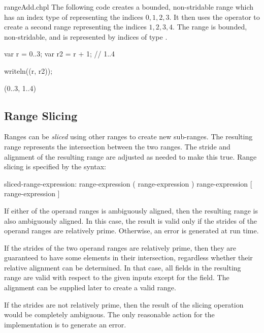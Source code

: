 \begin{chapelexample}{rangeAdd.chpl}
The following code creates a bounded, non-stridable range 
which has an index type of  representing the indices ${0, 1, 2, 3}$.  
It then uses the \chpl{+} operator to create a second range 
representing the indices ${1, 2, 3, 4}$.  The  range is bounded,
non-stridable, and is represented by indices of type .
\begin{chapel}
var r = 0..3;
var r2 = r + 1;    // 1..4
\end{chapel}
\begin{chapelpost}
writeln((r, r2));
\end{chapelpost}
\begin{chapeloutput}
(0..3, 1..4)
\end{chapeloutput}
\end{chapelexample}


\subsection{Range Slicing}
\label{Range_Slicing}

Ranges can be \emph{sliced} using other ranges to create new
sub-ranges.  The resulting range represents the intersection between
the two ranges.  The stride and alignment of the resulting range are adjusted as
needed to make this true.  Range slicing is specified by the syntax:
\begin{syntax}
sliced-range-expression:
  range-expression ( range-expression )
  range-expression [ range-expression ]
\end{syntax}

If either of the operand ranges is ambiguously aligned, then the resulting range
is also ambiguously aligned.  In this case, the result is valid only if the
strides of the operand ranges are relatively prime.  Otherwise, an error is
generated at run time.

\begin{rationale}
If the strides of the two operand ranges are relatively prime, then they are
guaranteed to have some elements in their intersection, regardless whether their
relative alignment can be determined.  In that case, all fields in the resulting
range are valid with respect to the given inputs except for the 
field.  The alignment can be supplied later to create a valid range.

If the strides are not relatively prime, then the result of the slicing
operation would be completely ambiguous.  The only reasonable action for the
implementation is to generate an error.
\end{rationale}

